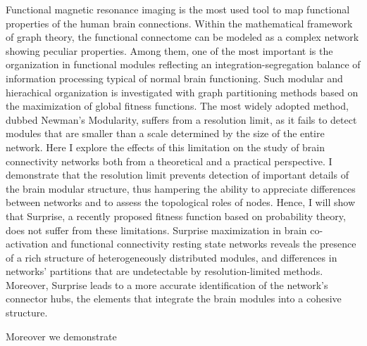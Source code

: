 Functional magnetic resonance imaging is the most used tool to map functional properties of the human brain connections. Within the mathematical framework of graph theory, the functional connectome can be modeled as a complex network showing peculiar properties.
Among them, one of the most important is the organization in functional modules reflecting an integration-segregation balance of information processing typical of normal brain functioning.
Such modular and hierachical organization is investigated with graph partitioning methods based on the maximization of global fitness functions. The most widely adopted method, dubbed Newman's Modularity, suffers from a resolution limit, as it fails to detect modules that are smaller than a scale determined by the size of the entire network.
Here I explore the effects of this limitation on the study of brain connectivity networks both from a theoretical and a practical perspective.
I demonstrate that the resolution limit prevents detection of important details of the brain modular structure, thus hampering the ability to appreciate differences between networks and to assess the topological roles of nodes.
Hence, I will show that Surprise, a recently proposed fitness function based on probability theory, does not suffer from these limitations.
Surprise maximization in brain co-activation and functional connectivity resting state networks reveals the presence of a rich structure of heterogeneously distributed modules, and differences in networks' partitions that are undetectable by resolution-limited methods.
Moreover, Surprise leads to a more accurate identification of the network's connector hubs, the elements that integrate the brain modules into a cohesive structure.

Moreover we demonstrate